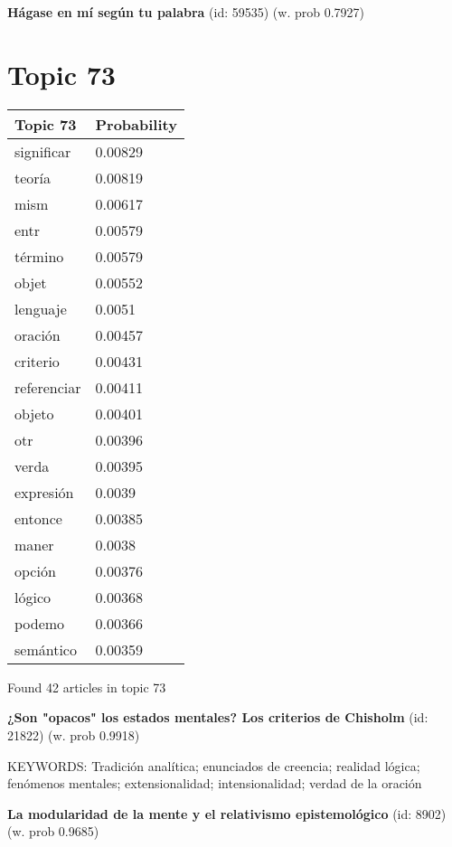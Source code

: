 \documentclass{article}
\begin{document}
\textbf{Hágase en mí según tu palabra} (id: 59535)
 (w. prob 0.7927)

\vfill
\newpage


\centering
\thispagestyle{empty}
\section*{Topic 73}\vfill
\begin{tabular}{ll}
\toprule
    Topic 73 & Probability \\
\midrule
  significar &     0.00829 \\
      teoría &     0.00819 \\
        mism &     0.00617 \\
        entr &     0.00579 \\
     término &     0.00579 \\
       objet &     0.00552 \\
    lenguaje &      0.0051 \\
     oración &     0.00457 \\
    criterio &     0.00431 \\
 referenciar &     0.00411 \\
      objeto &     0.00401 \\
         otr &     0.00396 \\
       verda &     0.00395 \\
   expresión &      0.0039 \\
     entonce &     0.00385 \\
       maner &      0.0038 \\
      opción &     0.00376 \\
      lógico &     0.00368 \\
      podemo &     0.00366 \\
   semántico &     0.00359 \\
\bottomrule
\end{tabular}

\vfill
Found 42 articles in topic 73
\vfill

\textbf{¿Son "opacos" los estados mentales? Los criterios de Chisholm} (id: 21822)
 (w. prob 0.9918)


KEYWORDS:
Tradición analítica; enunciados de creencia; realidad lógica; fenómenos mentales; extensionalidad; intensionalidad; verdad de la oración
\vfill

\textbf{La modularidad de la mente y el relativismo epistemológico} (id: 8902)
 (w. prob 0.9685)
\end{document}
